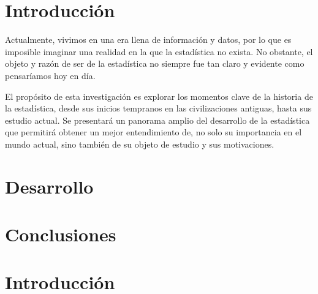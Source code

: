 \documentclass[12pt, a4paper]{article}
\begin{document}
\sffamily
{}


\section{Introducción}

Actualmente, vivimos en una era llena de información y datos, por lo que es imposible imaginar una realidad en la que la estadística no exista. No obstante, el objeto y razón de ser de la estadística no siempre fue tan claro y evidente como pensaríamos hoy en día.

El propósito de esta investigación es explorar los momentos clave de la historia de la estadística, desde sus inicios tempranos en las civilizaciones antiguas, hasta sus estudio actual. Se presentará un panorama amplio del desarrollo de la estadística que permitirá obtener un mejor entendimiento de, no solo su importancia en el mundo actual, sino también de su objeto de estudio y sus motivaciones.

\section{Desarrollo}

\section{Conclusiones}

\section{Introducción}
\end{document}
